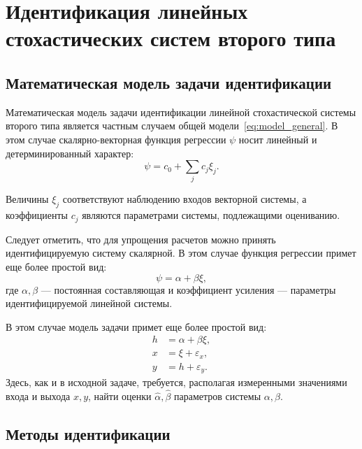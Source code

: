 \chapter[Идентификация линейных стохастических систем второго типа]{%
  Идентификация линейных стохастических систем второго типа
}

\section{Математическая модель задачи идентификации}

Математическая модель задачи идентификации линейной стохастической системы второго типа
является частным случаем общей модели~\eqref{eq:model_general}.
В этом случае скалярно-векторная функция регрессии \( \psi \) носит линейный и
детерминированный характер:
\begin{equation*}
  \psi = c_0 + \sum_j c_j \xi_j.
\end{equation*}

Величины \( \xi_j \) соответствуют наблюдению входов векторной системы,
а коэффициенты \( c_j \) являются параметрами системы, подлежащими оцениванию.

{\color{red}
Следует отметить,
что для упрощения расчетов можно принять идентифицируемую систему скалярной.
}
В этом случае функция регрессии примет еще более простой вид:
\begin{equation}
  \psi = \alpha + \beta \xi,
  \label{eq:fun_linear_scalar}
\end{equation}
где \( \alpha, \beta \) --- постоянная составляющая и коэффициент усиления ---
параметры идентифицируемой линейной системы.

В этом случае модель задачи примет еще более простой вид:
\begin{equation}
  \label{eq:model_linear_scalar}
  \begin{aligned}
  h &= \alpha + \beta \xi, \\
  x &= \xi + \varepsilon_x, \\
  y &= h + \varepsilon_y.
  \end{aligned}
\end{equation}
Здесь, как и в исходной задаче, требуется,
располагая измеренными значениями входа и выхода \( x, y \),
найти оценки \( \hat{\alpha}, \hat{\beta} \) параметров системы \( \alpha, \beta \).


\section{Методы идентификации}

